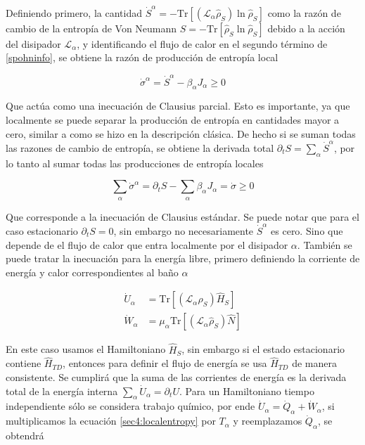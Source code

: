 Definiendo primero, la cantidad $\dot{S}^{\alpha} = - \text{Tr}[(\mathcal{L}_{\alpha}\hat{\rho}_{S}) \ln \hat{\rho}_{S} ]$ como la razón de cambio de la entropía de Von Neumann $S = - \text{Tr}[\hat{\rho}_{S} \ln \hat{\rho}_{S} ]$ debido a la acción del disipador $\mathcal{L}_{\alpha}$, y identificando el flujo de calor en el segundo término de \ref{spohninfo}, se obtiene la razón de producción de entropía local

\begin{equation}
    \dot{\sigma}^{\alpha} = \dot{S}^{\alpha} - \beta_{\alpha} J_{\alpha} \geq 0
\label{sec4:localentropy}
\end{equation}

Que actúa como una inecuación de Clausius parcial. Esto es importante, ya que localmente se puede separar la producción de entropía en cantidades mayor a cero, similar a como se hizo en la descripción clásica. De hecho si se suman todas las razones de cambio de entropía, se obtiene la derivada total $\partial_{t} S = \sum_{\alpha} \dot{S}^{\alpha}$, por lo tanto al sumar todas las producciones de entropía locales

\begin{equation*}
    \sum_{\alpha}\dot{\sigma}^{\alpha} = \partial_{t}S - \sum_{\alpha}\beta_{\alpha}J_{\alpha} = \dot{\sigma} \geq 0
\end{equation*}

Que corresponde a la inecuación de Clausius estándar. Se puede notar que para el caso estacionario $\partial_{t}S = 0$, sin embargo no necesariamente $\dot{S}^{\alpha}$ es cero. Sino que depende de el flujo de calor que entra localmente por el disipador $\alpha$. También se puede tratar la inecuación para la energía libre, primero definiendo la corriente de energía y calor correspondientes al baño $\alpha$

\begin{align*}
    \dot{U}_{\alpha} & = \text{Tr}[ (\mathcal{L}_{\alpha} \hat{\rho}_{S}) \hat{H}_{S}] \\
    \dot{W}_{\alpha} & = \mu_{\alpha}\text{Tr}[ (\mathcal{L}_{\alpha} \hat{\rho}_{S}) \hat{N}]
\end{align*}

En este caso usamos el Hamiltoniano $\hat{H}_{S}$, sin embargo si el estado estacionario contiene $\hat{H}_{TD}$, entonces para definir el flujo de energía se usa $\hat{H}_{TD}$ de manera consistente. Se cumplirá que la suma de las corrientes de energía es la derivada total de la energía interna $\sum_{\alpha} \dot{U}_{\alpha} = \partial_{t}U$. Para un Hamiltoniano tiempo independiente sólo se considera trabajo químico, por ende $\dot{U}_{\alpha} = \dot{Q}_{\alpha} + \dot{W}_{\alpha}$, si multiplicamos la ecuación \ref{sec4:localentropy} por $T_{\alpha}$ y reemplazamos $\dot{Q}_{\alpha}$, se obtendrá

